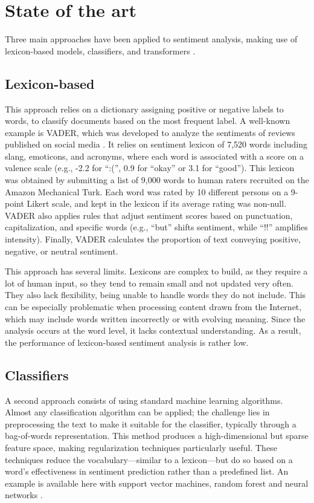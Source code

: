 \documentclass{article}
\begin{document}
\section{State of the art}

Three main approaches have been applied to sentiment analysis, making use of lexicon-based models, classifiers, and transformers \citep{hartmann_more_2023}.

\subsection{Lexicon-based}

This approach relies on a dictionary assigning positive or negative labels to words, to classify documents based on the most frequent label. A well-known example is VADER, which was developed to analyze the sentiments of reviews published on social media \citep{hutto_vader_2014}. It relies on sentiment lexicon of 7,520 words including slang, emoticons, and acronyms, where each word is associated with a score on a valence scale (e.g., -2.2 for \enquote{:(}, 0.9 for \enquote{okay} or 3.1 for \enquote{good}). This lexicon was obtained by submitting a list of 9,000 words to human raters recruited on the Amazon Mechanical Turk. Each word was rated by 10 different persons on a 9-point Likert scale, and kept in the lexicon if its average rating was non-null. VADER also applies rules that adjust sentiment scores based on punctuation, capitalization, and specific words (e.g., \enquote{but} shifts sentiment, while \enquote{!!} amplifies intensity). Finally, VADER calculates the proportion of text conveying positive, negative, or neutral sentiment.

This approach has several limits. Lexicons are complex to build, as they require a lot of human input, so they tend to remain small and not updated very often. They also lack flexibility, being unable to handle words they do not include. This can be especially problematic when processing content drawn from the Internet, which may include words written incorrectly or with evolving meaning. Since the analysis occurs at the word level, it lacks contextual understanding. As a result, the performance of lexicon-based sentiment analysis is rather low.

\subsection{Classifiers}

A second approach consists of using standard machine learning algorithms. Almost any classification algorithm can be applied; the challenge lies in preprocessing the text to make it suitable for the classifier, typically through a bag-of-words representation. This method produces a high-dimensional but sparse feature space, making regularization techniques particularly useful. These techniques reduce the vocabulary—similar to a lexicon—but do so based on a word’s effectiveness in sentiment prediction rather than a predefined list. An example is available here with support vector machines, random forest and neural networks \citep{wang_is_2024}.
\end{document}
